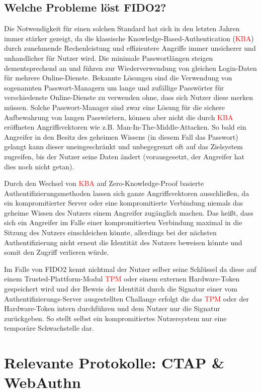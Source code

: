 \documentclass[journal]{IEEEtran}
\begin{document}
\subsection{Welche Probleme löst FIDO2?}

Die Notwendigkeit für einen solchen Standard hat sich in den letzten Jahren
immer stärker gezeigt, da die klassische Knowledge-Based-Authentication
(\textcolor{red}{KBA})
durch zunehmende Rechenleistung und effizientere Angriffe immer unsicherer und
unhandlicher für Nutzer wird. Die minimale Passwortlängen steigen
dementsprechend an und führen zur Wiederverwendung von gleichen Login-Daten für
mehrere Online-Dienste. Bekannte Lösungen sind die Verwendung von sogenannten
Passwort-Managern um lange und zufällige Passwörter für verschiedenste
Online-Dienste zu verwenden ohne, dass sich Nutzer diese merken müssen. Solche
Passwort-Manager sind zwar eine Lösung für die sichere Aufbewahrung von langen
Passwörtern, können aber nicht die durch \textcolor{red}{KBA} eröffneten
Angriffsvektoren wie z.B. Man-In-The-Middle-Attacken. So bald ein Angreifer
in den Besitz des geheimen Wissens (in diesem Fall das Passwort) gelangt kann
dieser uneingeschränkt und unbegegrenzt oft auf das Zielsystem zugreifen, bis
der Nutzer seine Daten ändert (vorausgesetzt, der Angreifer hat dies noch nicht
getan).

Durch den Wechsel von \textcolor{red}{KBA} auf Zero-Knowledge-Proof basierte
Authentifizierungsmethoden lassen sich ganze Angriffsvektoren ausschließen, da
ein kompromitierter Server oder eine kompromitierte Verbindung niemals das
geheime Wissen des Nutzers einem Angreifer zugänglich machen. Das heißt, dass
sich ein Angreifer im Falle einer kompromitierten Verbindung maximal in die
Sitzung des Nutzers einschleichen könnte, allerdings bei der nächsten
Authentifizierung nicht erneut die Identität des Nutzers beweisen könnte und
somit den Zugriff verlieren würde.

Im Falle von FIDO2 kennt nichtmal der Nutzer selber seine Schlüssel da diese
auf einem Trusted-Plattform-Modul \textcolor{red}{TPM} oder einem externen
Hardware-Token gespeichert wird und der Beweis der Identität durch die Signatur
einer vom Authentifizierungs-Server ausgestellten Challange erfolgt die das
\textcolor{red}{TPM} oder der Hardware-Token intern durchführen und dem Nutzer
nur die Signatur zurückgeben. So stellt selbst ein kompromitiertes Nutzersystem
nur eine temporäre Schwachstelle dar.


\section{Relevante Protokolle: CTAP \& WebAuthn}
\end{document}
